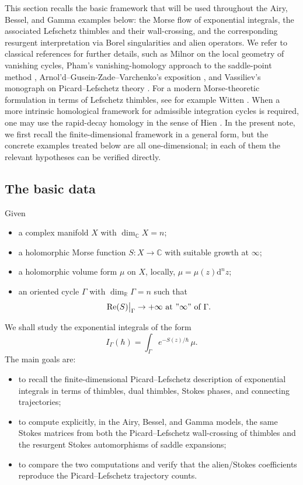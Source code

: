 \documentclass[11pt]{amsart}
\theoremstyle{plain}
\newcommand{\R}{\mathbb R}
\newcommand{\C}{\mathbb C}
\newcommand{\dd}{\mathrm d}
\newcommand{\re}{\operatorname{Re}}
\begin{document}
This section recalls the basic framework that will be used throughout the Airy, Bessel, and Gamma examples below: the Morse flow of exponential integrals, the associated Lefschetz thimbles and their wall-crossing, and the corresponding resurgent interpretation via Borel singularities and alien operators. We refer to classical references for further details, such as Milnor \cite{Milnor-1968} on the local geometry of vanishing cycles, Pham's vanishing-homology approach to the saddle-point method \cite{Pham1983}, Arnol'd--Gusein-Zade--Varchenko's exposition \cite{AGV2}, and Vassiliev's monograph on Picard--Lefschetz theory \cite{Vassiliev2002}. For a modern Morse-theoretic formulation in terms of Lefschetz thimbles, see for example Witten \cite{Witten2011CS}. When a more intrinsic homological framework for admissible integration cycles is required, one may use the rapid-decay homology in the sense of Hien \cite{Hien2009}. In the present note, we first recall the finite-dimensional framework in a general form, but the concrete examples treated below are all one-dimensional; in each of them the relevant hypotheses can be verified directly.

\smallskip
\subsection{The basic data}

Given
\begin{itemize}
    \item a complex manifold $X$ with $\dim_{\C}X=n$;
    \item a holomorphic Morse function $S:X\rightarrow\C$ with suitable growth at $\infty$;
    \item a holomorphic volume form $\mu$ on $X$, locally, $\mu=\mu(z)\dd^nz$;
    \item an oriented cycle $\Gamma$ with $\dim_{\R}\Gamma=n$ such that
    \[\re(S)\big|_{\Gamma}\rightarrow+\infty\text{ at } "\infty" \text{ of }\Gamma.\]
\end{itemize}
We shall study the exponential integrals of the form
\begin{equation}\label{eq:general-integral}
I_\Gamma(\hbar)=\int_\Gamma e^{-S(z)/\hbar}\,\mu.
\end{equation}
The main goals are:
\begin{itemize}
    \item[$\diamond$] to recall the finite-dimensional
    Picard--Lefschetz description of exponential integrals in terms of
    thimbles, dual thimbles, Stokes phases, and connecting trajectories;
    \item[$\diamond$] to compute explicitly, in the Airy, Bessel, and Gamma
    models, the same Stokes matrices from both the Picard--Lefschetz
    wall-crossing of thimbles and the resurgent Stokes automorphisms of
    saddle expansions;
    \item[$\diamond$] to compare the two computations and verify that the
    alien/Stokes coefficients reproduce the Picard--Lefschetz trajectory
    counts.
\end{itemize}
\end{document}
